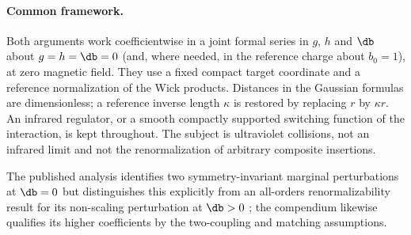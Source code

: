 \paragraph{Common framework.} Both arguments work coefficientwise in a joint formal series in $g$, $h$ and $\db$ about
$g=h=\db=0$ (and, where needed, in the reference charge about $b_0=1$), at zero magnetic field. They use a fixed compact
target coordinate and a reference normalization of the Wick products. Distances in the Gaussian formulas are
dimensionless; a reference inverse length $\kappa$ is restored by replacing $r$ by $\kappa r$. An infrared regulator,
or a smooth compactly supported switching function of the interaction, is kept throughout. The subject is ultraviolet
collisions, not an infrared limit and not the renormalization of arbitrary composite insertions.

The published analysis identifies two symmetry-invariant marginal perturbations at $\db=0$ but distinguishes this
explicitly from an all-orders renormalizability result for its non-scaling perturbation at $\db>0$
\cite[Secs.~3.2.3, 4 and~6]{sri:Benedetti:2025nzp}; the compendium likewise qualifies its higher coefficients by the
two-coupling and matching assumptions.

